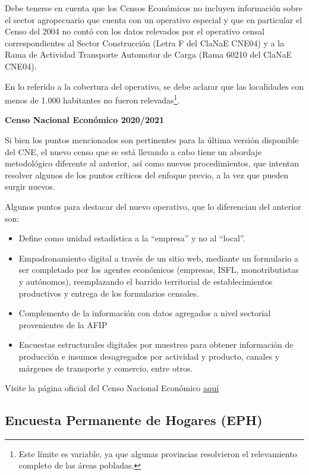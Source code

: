 \documentclass[
  openany]{book}
\providecommand{\tightlist}{%
  \setlength{\itemsep}{0pt}\setlength{\parskip}{0pt}}
\begin{document}
Debe tenerse en cuenta que los Censos Económicos no incluyen información sobre el sector agropecuario que cuenta con un operativo especial y que en particular el Censo del 2004 no contó con los datos relevados por el operativo censal correspondientes al Sector Construcción (Letra F del ClaNaE CNE04) y a la Rama de Actividad Transporte Automotor de Carga (Rama 60210 del ClaNaE CNE04).

En lo referido a la cobertura del operativo, se debe aclarar que las localidades con menos de 1.000 habitantes no fueron relevadas\footnote{Este límite es variable, ya que algunas provincias resolvieron el relevamiento completo de las áreas pobladas.}.

\textbf{Censo Nacional Económico 2020/2021}

Si bien los puntos mencionados son pertinentes para la última versión disponible del CNE, el nuevo censo que se está llevando a cabo tiene un abordaje metodológico diferente al anterior, así como nuevos procedimientos, que intentan resolver algunos de los puntos críticos del enfoque previo, a la vez que pueden surgir nuevos.

Algunos puntos para destacar del nuevo operativo, que lo diferencian del anterior son:

\begin{itemize}
\tightlist
\item
  Define como unidad estadística a la ``empresa'' y no al ``local''.
\item
  Empadronamiento digital a través de un sitio web, mediante un formulario a ser completado por los agentes económicos (empresas, ISFL, monotributistas y autónomos), reemplazando el barrido territorial de establecimientos productivos y entrega de los formularios censales.
\item
  Complemento de la información con datos agregados a nivel sectorial provenientes de la AFIP
\item
  Encuestas estructurales digitales por muestreo para obtener información de producción e insumos desagregados por actividad y producto, canales y márgenes de transporte y comercio, entre otros.
\end{itemize}

Visite la página oficial del Censo Nacional Económico \href{https://censoeconomico.indec.gob.ar/}{aquí}

\hypertarget{encuesta-permanente-de-hogares-eph}{%
\subsection{Encuesta Permanente de Hogares (EPH)}\label{encuesta-permanente-de-hogares-eph}}
\end{document}
